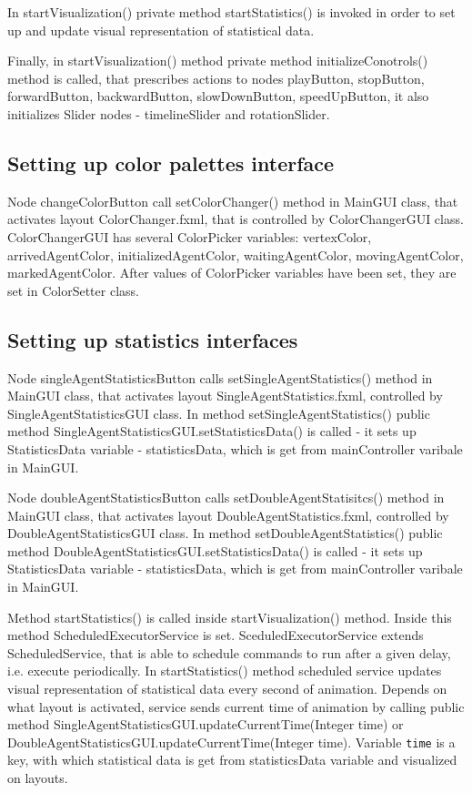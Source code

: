\documentclass[thesis=B,english]{FITthesis}[2019/12/23]
\begin{document}
In startVisualization() private method startStatistics() is invoked in order to set up and update visual representation of statistical data.

Finally, in startVisualization() method private method initializeConotrols() method is called, that prescribes actions to nodes playButton, stopButton, forwardButton, backwardButton, slowDownButton, speedUpButton, it also initializes Slider nodes - timelineSlider and rotationSlider. 

\subsection{Setting up color palettes interface}

Node changeColorButton call setColorChanger() method in MainGUI class, that activates layout ColorChanger.fxml, that is controlled by ColorChangerGUI class. ColorChangerGUI has several ColorPicker variables: vertexColor, arrivedAgentColor, initializedAgentColor, waitingAgentColor, movingAgentColor, markedAgentColor. After values of ColorPicker variables have been set, they are set in ColorSetter class.  


\subsection{Setting up statistics interfaces}

Node singleAgentStatisticsButton calls setSingleAgentStatistics() method in MainGUI class, that activates layout SingleAgentStatistics.fxml, controlled by SingleAgentStatisticsGUI class. In method setSingleAgentStatistics() public method SingleAgentStatisticsGUI.setStatisticsData() is called -  it sets up StatisticsData variable - statisticsData, which is get from mainController varibale in MainGUI. 

Node doubleAgentStatisticsButton calls setDoubleAgentStatisitcs() method in MainGUI class, that activates layout DoubleAgentStatistics.fxml, controlled by DoubleAgentStatisticsGUI class. In method setDoubleAgentStatistics() public method DoubleAgentStatisticsGUI.setStatisticsData() is called -  it sets up StatisticsData variable - statisticsData, which is get from mainController varibale in MainGUI.

Method startStatistics() is called inside startVisualization() method. Inside this method ScheduledExecutorService is set. SceduledExecutorService extends ScheduledService, that is able to schedule commands to run after a given delay, i.e. execute periodically. In startStatistics() method scheduled service updates visual representation of statistical data every second of animation. Depends on what layout is activated, service sends current time of animation by calling public method SingleAgentStatisticsGUI.updateCurrentTime(Integer time) or DoubleAgentStatisticsGUI.updateCurrentTime(Integer time). Variable \verb|time| is a key, with which statistical data is get from statisticsData variable and visualized on layouts.
\end{document}
